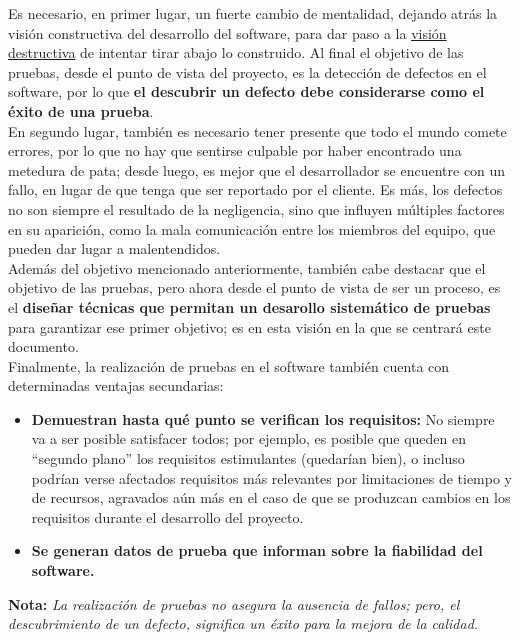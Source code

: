 Es necesario, en primer lugar, un fuerte cambio de mentalidad, dejando atrás la visión constructiva del desarrollo del software, para dar paso a la \uline{visión destructiva} de intentar tirar abajo lo construido. Al final el objetivo de las pruebas, desde el punto de vista del proyecto, es la detección de defectos en el software, por lo que \textbf{el descubrir un defecto debe considerarse como el éxito de una prueba}.\\

En segundo lugar, también es necesario tener presente que todo el mundo comete errores, por lo que no hay que sentirse culpable por haber encontrado una metedura de pata; desde luego, es mejor que el desarrollador se encuentre con un fallo, en lugar de que tenga que ser reportado por el cliente. Es más, los defectos no son siempre el resultado de la negligencia, sino que influyen múltiples factores en su aparición, como la mala comunicación entre los miembros del equipo, que pueden dar lugar a malentendidos.\\

Además del objetivo mencionado anteriormente, también cabe destacar que el objetivo de las pruebas, pero ahora desde el punto de vista de ser un proceso, es el \textbf{diseñar técnicas que permitan un desarollo sistemático de pruebas} para garantizar ese primer objetivo; es en esta visión en la que se centrará este documento.\\

Finalmente, la realización de pruebas en el software también cuenta con determinadas ventajas secundarias:

\begin{itemize}
    \item \textbf{Demuestran hasta qué punto se verifican los requisitos:} No siempre va a ser posible satisfacer todos; por ejemplo, es posible que queden en ``segundo plano'' los requisitos estimulantes (quedarían bien), o incluso podrían verse afectados requisitos más relevantes por limitaciones de tiempo y de recursos, agravados aún más en el caso de que se produzcan cambios en los requisitos durante el desarrollo del proyecto.
    \item \textbf{Se generan datos de prueba que informan sobre la fiabilidad del software.}
\end{itemize}

\textbf{Nota:} \textit{La realización de pruebas no asegura la ausencia de fallos; pero, el descubrimiento de un defecto, significa un éxito para la mejora de la calidad.}\\


